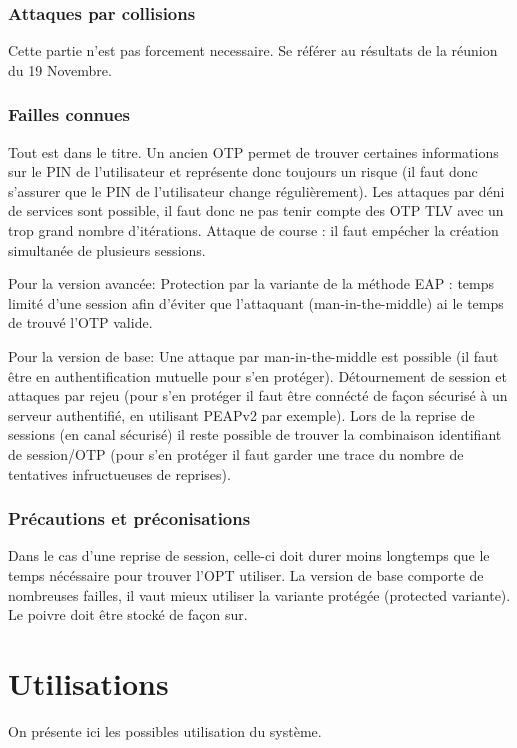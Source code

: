 \documentclass{../res/univ-projet}
\begin{document}
    \subsubsection{Attaques par collisions}
    Cette partie n'est pas forcement necessaire. Se référer au résultats de la réunion du 19 Novembre.
    
    \subsubsection{Failles connues}
    Tout est dans le titre.
    Un ancien OTP permet de trouver certaines informations sur le PIN de l'utilisateur et représente donc toujours un risque (il faut donc s'assurer que le PIN de l'utilisateur change régulièrement).
    Les attaques par déni de services sont possible, il faut donc ne pas tenir compte des OTP TLV avec un trop grand nombre d'itérations.
    Attaque de course : il faut empécher la création simultanée de plusieurs sessions.
    
    Pour la version avancée:
    Protection par la variante de la méthode EAP : temps limité d'une session afin d'éviter que l'attaquant (man-in-the-middle) ai le temps de trouvé l'OTP valide.
    
    Pour la version de base:
    Une attaque par man-in-the-middle est possible (il faut être en authentification mutuelle pour s'en protéger).
    Détournement de session et attaques par rejeu (pour s'en protéger il faut être connécté de façon sécurisé à un serveur authentifié, en utilisant PEAPv2 par exemple).
    Lors de la reprise de sessions (en canal sécurisé) il reste possible de trouver la combinaison identifiant de session/OTP (pour s'en protéger il faut garder une trace du nombre de tentatives infructueuses de reprises).
    
    \subsubsection{Précautions et préconisations}
    Dans le cas d'une reprise de session, celle-ci doit durer moins longtemps que le temps nécéssaire pour trouver l'OPT utiliser.
    La version de base comporte de nombreuses failles, il vaut mieux utiliser la variante protégée (protected variante).
    Le poivre doit être stocké de façon sur.
    
\section{Utilisations}
On présente ici les possibles utilisation du système.
\end{document}
